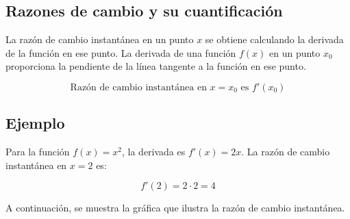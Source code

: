 \subsection{Razones de cambio y su cuantificación}


La razón de cambio instantánea en un punto \(x\) se obtiene calculando la derivada de la función en ese punto. La derivada de una función \(f(x)\) en un punto \(x_0\) proporciona la pendiente de la línea tangente a la función en ese punto.

\[
\text{Razón de cambio instantánea en } x = x_0 \text{ es } f'(x_0)
\]

\subsection{Ejemplo}
Para la función \(f(x) = x^2\), la derivada es \(f'(x) = 2x\). La razón de cambio instantánea en \(x = 2\) es:

\[
f'(2) = 2 \cdot 2 = 4
\]

A continuación, se muestra la gráfica que ilustra la razón de cambio instantánea.

\begin{center}
\end{center}



